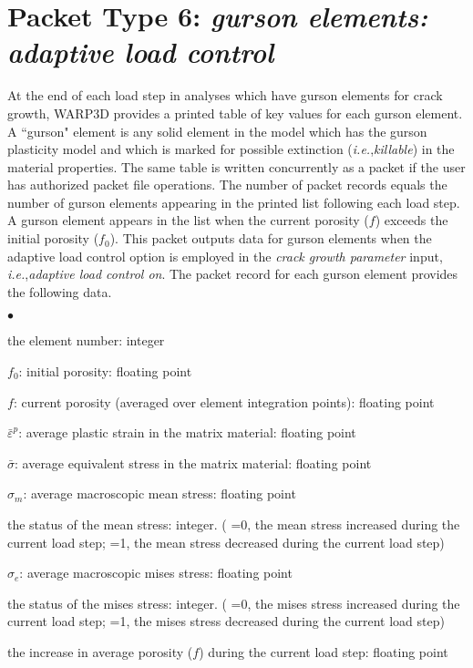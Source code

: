 \documentclass[10pt]{report}
\numberwithin{equation}{section}
\newcommand{\ie}{\ti{i.e.},\xspace}
\newcommand{\ti}{\emph}
\newcommand{\squishlist}{
 \begin{list}{$\bullet$}
  { \setlength{\itemsep}{0pt}
     \setlength{\parsep}{3pt}
     \setlength{\topsep}{3pt}
     \setlength{\partopsep}{0pt}
     \setlength{\leftmargin}{1.5em}
     \setlength{\labelwidth}{1em}
     \setlength{\labelsep}{0.5em} } }
\newcommand{\squishend}{
  \end{list}  }
\begin{document}
\section{Packet Type 6: \ti{gurson elements: adaptive load control}}
At the end of each load step in analyses which have gurson 
elements for crack growth, WARP3D provides a printed table of key values 
for each gurson element. A ``gurson" element is any solid
element in the model which has the gurson plasticity model and
which is marked for possible extinction (\ie \ti{killable}) in the 
material properties. The same table is written concurrently as a packet 
if the user has authorized packet file operations. The number of packet records 
equals the number of gurson elements appearing in the printed list following 
each load step. A gurson element appears in the list when the current porosity 
($f$) exceeds the initial porosity ($f_0$). This packet outputs data for gurson 
elements when the adaptive load control option is employed in the 
\ti{crack growth parameter }input, \ie \ti{adaptive load control on}. 
The packet record for each gurson element provides the following data.
\squishlist
\item the element number:  integer
\item $f_0$:  initial porosity:  floating point
\item $f$:  current porosity (averaged over element integration points):  floating point
\item $\bar \varepsilon^p$:  average plastic strain in the matrix material:  floating point
\item $\bar \sigma$:  average equivalent stress in the matrix material:  floating point
\item $\sigma_{m}$:  average macroscopic mean stress:  floating point
\item the status of the mean stress: integer. ( =0, the mean 
stress increased during the current load step;
=1, the mean stress decreased during the current load step)
\item $\sigma_{e}$:  average macroscopic mises stress:  floating point
\item the status of the mises stress:  integer.
( =0, the mises stress increased during the current load step; 
=1, the mises stress decreased during the current load step)
\item the increase in average porosity ($f$) during the current load step:  floating point 
\squishend

%
%
\end{document}
